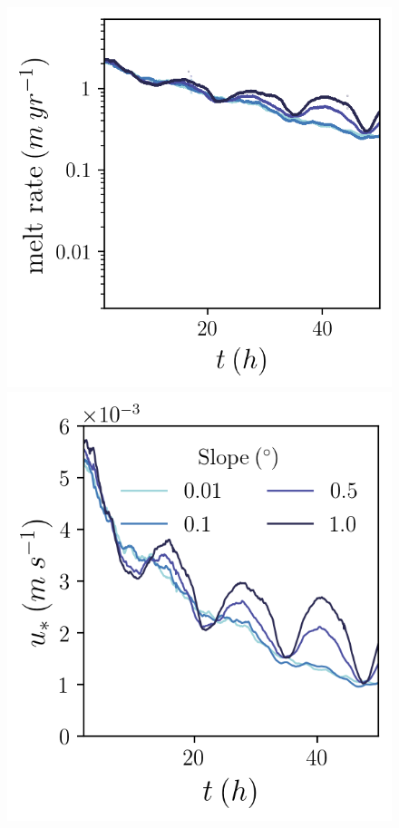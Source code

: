 \documentclass[draft]{agujournal2019}
\begin{document}
\begin{figure}[h!]
\begin{minipage}{0.33\textwidth}
    \end{minipage}%
    \begin{minipage}{0.33\textwidth}
        \includegraphics[trim={0 0 0 0},clip,width=\textwidth]{Figures/melt_cmp_dslope_t.png}
    \end{minipage}%
    \begin{minipage}{0.33\textwidth}
        \includegraphics[trim={0 0 0 0},clip,width=\textwidth]{Figures/us_cmp_dslope_t.png}

\end{minipage}
\end{figure}
\end{document}
